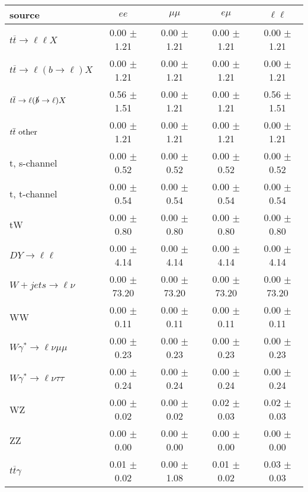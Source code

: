 \begin{tabular}{l|cccc} \hline\hline
source & $ee$ & $\mu\mu$ & $e\mu$ & $\ell\ell $ \\
\hline
$t\overline{t} \rightarrow \ell \ell X$ &  0.00 $\pm$  1.21 &  0.00 $\pm$  1.21 &  0.00 $\pm$  1.21 &  0.00 $\pm$  1.21 \\
$t\overline{t} \rightarrow \ell (b \rightarrow \ell) X$ &  0.00 $\pm$  1.21 &  0.00 $\pm$  1.21 &  0.00 $\pm$  1.21 &  0.00 $\pm$  1.21 \\
$t\overline{t} \rightarrow \ell (\slashed b \rightarrow \ell) X$ &  0.56 $\pm$  1.51 &  0.00 $\pm$  1.21 &  0.00 $\pm$  1.21 &  0.56 $\pm$  1.51 \\
        $t\overline{t}\ \rm{other}$ &  0.00 $\pm$  1.21 &  0.00 $\pm$  1.21 &  0.00 $\pm$  1.21 &  0.00 $\pm$  1.21 \\
\hline
                       t, s-channel &  0.00 $\pm$  0.52 &  0.00 $\pm$  0.52 &  0.00 $\pm$  0.52 &  0.00 $\pm$  0.52 \\
                       t, t-channel &  0.00 $\pm$  0.54 &  0.00 $\pm$  0.54 &  0.00 $\pm$  0.54 &  0.00 $\pm$  0.54 \\
                                 tW &  0.00 $\pm$  0.80 &  0.00 $\pm$  0.80 &  0.00 $\pm$  0.80 &  0.00 $\pm$  0.80 \\
\hline
         $DY \rightarrow \ell \ell$ &  0.00 $\pm$  4.14 &  0.00 $\pm$  4.14 &  0.00 $\pm$  4.14 &  0.00 $\pm$  4.14 \\
      $W+jets \rightarrow \ell \nu$ &  0.00 $\pm$ 73.20 &  0.00 $\pm$ 73.20 &  0.00 $\pm$ 73.20 &  0.00 $\pm$ 73.20 \\
                                 WW &  0.00 $\pm$  0.11 &  0.00 $\pm$  0.11 &  0.00 $\pm$  0.11 &  0.00 $\pm$  0.11 \\
\hline
$W\gamma^{*} \rightarrow \ell \nu \mu\mu$ &  0.00 $\pm$  0.23 &  0.00 $\pm$  0.23 &  0.00 $\pm$  0.23 &  0.00 $\pm$  0.23 \\
$W\gamma^{*} \rightarrow \ell \nu \tau\tau$ &  0.00 $\pm$  0.24 &  0.00 $\pm$  0.24 &  0.00 $\pm$  0.24 &  0.00 $\pm$  0.24 \\
                                 WZ &  0.00 $\pm$  0.02 &  0.00 $\pm$  0.02 &  0.02 $\pm$  0.03 &  0.02 $\pm$  0.03 \\
                                 ZZ &  0.00 $\pm$  0.00 &  0.00 $\pm$  0.00 &  0.00 $\pm$  0.00 &  0.00 $\pm$  0.00 \\
\hline
              $t\overline{t}\gamma$ &  0.01 $\pm$  0.02 &  0.00 $\pm$  1.08 &  0.01 $\pm$  0.02 &  0.03 $\pm$  0.03 \\

\end{tabular}
